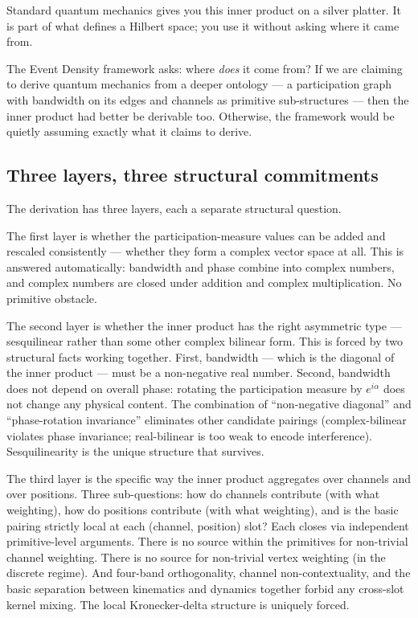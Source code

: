 \documentclass[11pt,a4paper]{article}
\begin{document}
Standard quantum mechanics gives you this inner product on a silver platter. It is part of what defines a Hilbert space; you use it without asking where it came from.

The Event Density framework asks: where \emph{does} it come from? If we are claiming to derive quantum mechanics from a deeper ontology --- a participation graph with bandwidth on its edges and channels as primitive sub-structures --- then the inner product had better be derivable too. Otherwise, the framework would be quietly assuming exactly what it claims to derive.

\subsection{Three layers, three structural commitments}

The derivation has three layers, each a separate structural question.

The first layer is whether the participation-measure values can be added and rescaled consistently --- whether they form a complex vector space at all. This is answered automatically: bandwidth and phase combine into complex numbers, and complex numbers are closed under addition and complex multiplication. No primitive obstacle.

The second layer is whether the inner product has the right asymmetric type --- sesquilinear rather than some other complex bilinear form. This is forced by two structural facts working together. First, bandwidth --- which is the diagonal of the inner product --- must be a non-negative real number. Second, bandwidth does not depend on overall phase: rotating the participation measure by $e^{i\alpha}$ does not change any physical content. The combination of ``non-negative diagonal'' and ``phase-rotation invariance'' eliminates other candidate pairings (complex-bilinear violates phase invariance; real-bilinear is too weak to encode interference). Sesquilinearity is the unique structure that survives.

The third layer is the specific way the inner product aggregates over channels and over positions. Three sub-questions: how do channels contribute (with what weighting), how do positions contribute (with what weighting), and is the basic pairing strictly local at each (channel, position) slot? Each closes via independent primitive-level arguments. There is no source within the primitives for non-trivial channel weighting. There is no source for non-trivial vertex weighting (in the discrete regime). And four-band orthogonality, channel non-contextuality, and the basic separation between kinematics and dynamics together forbid any cross-slot kernel mixing. The local Kronecker-delta structure is uniquely forced.
\end{document}
